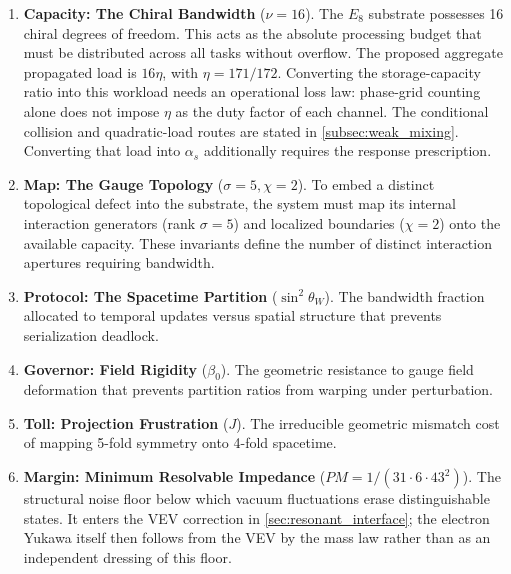 \begin{enumerate}
    \item \textbf{Capacity: The Chiral Bandwidth} ($\nu = 16$). The $E_8$ substrate possesses 16 chiral degrees of freedom. This acts as the absolute processing budget that must be distributed across all tasks without overflow. The proposed aggregate propagated load is $16\eta$, with $\eta=171/172$. Converting the storage-capacity ratio into this workload needs an operational loss law: phase-grid counting alone does not impose $\eta$ as the duty factor of each channel. The conditional collision and quadratic-load routes are stated in \cref{subsec:weak_mixing}. Converting that load into $\alpha_s$ additionally requires the response prescription.

    \item \textbf{Map: The Gauge Topology} ($\sigma = 5, \chi = 2$). To embed a distinct topological defect into the substrate, the system must map its internal interaction generators (rank $\sigma = 5$) and localized boundaries ($\chi = 2$) onto the available capacity. These invariants define the number of distinct interaction apertures requiring bandwidth.
    
    \item \textbf{Protocol: The Spacetime Partition} ($\sin^2\theta_W$). The bandwidth fraction allocated to temporal updates versus spatial structure that prevents serialization deadlock.

    \item \textbf{Governor: Field Rigidity} ($\beta_0$). The geometric resistance to gauge field deformation that prevents partition ratios from warping under perturbation.
    
    \item \textbf{Toll: Projection Frustration} ($J$). The irreducible geometric mismatch cost of mapping 5-fold symmetry onto 4-fold spacetime.
    
    \item \textbf{Margin: Minimum Resolvable Impedance} ($PM=1/(31\cdot6\cdot43^2)$). The structural noise floor below which vacuum fluctuations erase distinguishable states. It enters the VEV correction in \cref{sec:resonant_interface}; the electron Yukawa itself then follows from the VEV by the mass law rather than as an independent dressing of this floor.
\end{enumerate}